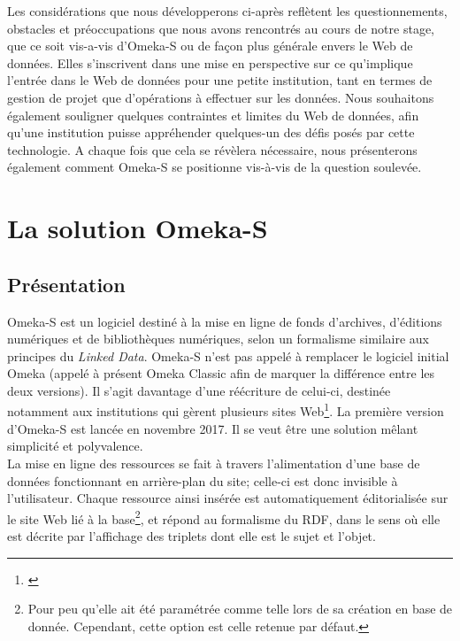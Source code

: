 \documentclass[a4paper,12pt,twoside]{book}
\begin{document}
Les considérations que nous développerons ci-après reflètent les questionnements, obstacles et préoccupations que nous avons rencontrés au cours de notre stage, que ce soit vis-a-vis d'Omeka-S ou de façon plus générale envers le Web de données. Elles s'inscrivent dans une mise en perspective sur ce qu'implique l'entrée dans le Web de données pour une petite institution, tant en termes de gestion de projet que d'opérations à effectuer sur les données. Nous souhaitons également souligner quelques contraintes et limites du Web de données, afin qu'une institution puisse appréhender quelques-un des défis posés par cette technologie. A chaque fois que cela se révèlera nécessaire, nous présenterons également comment Omeka-S se positionne vis-à-vis de la question soulevée. \\


\chapter{La solution Omeka-S}

\section{Présentation}

Omeka-S est un logiciel destiné à la mise en ligne de fonds d'archives, d'éditions numériques et de bibliothèques numériques, selon un formalisme similaire aux principes du \textit{Linked Data}. Omeka-S n'est pas appelé à remplacer le logiciel initial Omeka (appelé à présent \og Omeka Classic \fg{} afin de marquer la différence entre les deux versions). Il s'agit davantage d'une \og réécriture\fg{} de celui-ci, destinée notamment aux institutions qui gèrent plusieurs sites Web\footnote{\cite{OMEKA2016}}. La première version d'Omeka-S est lancée en novembre 2017. Il se veut être une solution mêlant simplicité et polyvalence.\\

La mise en ligne des ressources se fait à travers l'alimentation d'une base de données fonctionnant en arrière-plan du site; celle-ci est donc invisible à l'utilisateur. Chaque ressource ainsi insérée est automatiquement éditorialisée sur le site Web lié à la base\footnote{Pour peu qu'elle ait été paramétrée comme telle lors de sa création en base de donnée. Cependant, cette option est celle retenue par défaut.}, et répond au formalisme du RDF, dans le sens où elle est décrite par l'affichage des triplets dont elle est le sujet et l'objet.\\
\end{document}
